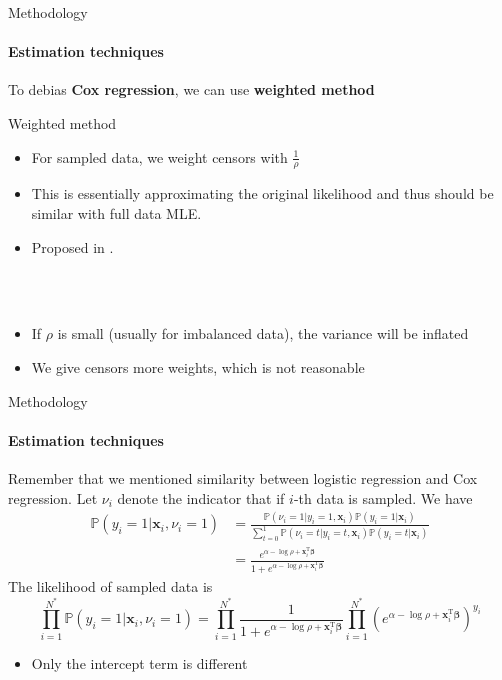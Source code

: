 \documentclass{beamer}
\newcommand{\red}{\color{red}}
\newcommand{\blue}{\color{blue}}
\newcommand{\bbeta}{\bm{\beta}}
\newcommand{\x}{\bm{x}}
\newcommand{\tp}{^{\mathrm{T}}}
\newcommand{\pr}{\mathbb{P}}
\begin{document}
\begin{frame}{Methodology}
    \framesubtitle{Estimation techniques}
    To debias {\blue\textbf{Cox regression}}, we can use {\red \textbf{weighted method}}
    \begin{block}{Weighted method}
        \begin{itemize}
            \item For sampled data, we weight censors with $\frac{1}{\rho}$
            \item This is essentially approximating the original likelihood and thus should be similar with full data MLE.
            \item Proposed in \cite{nir2023analyzing}.
        \end{itemize}
    \end{block}
    \hspace*{\fill}\\
    \hspace*{\fill}\\
    \begin{itemize}
        \item If $\rho$ is small (usually for imbalanced data), the variance will be inflated
        \item We give censors more weights, which is not reasonable
    \end{itemize}
    \end{frame}
\begin{frame}{Methodology}
    \framesubtitle{Estimation techniques}
    Remember that we mentioned similarity between logistic regression and Cox regression. Let $\nu_i$ denote the indicator that if $i$-th data is sampled. We have
    \begin{align*}
        \pr(y_i=1|\x_i,\nu_i=1)&=\frac{\pr(\nu_i=1|y_i=1,\x_i)\pr(y_i=1|\x_i)}{\sum_{t=0}^1\pr(\nu_i=t|y_i=t,\x_i)\pr(y_i=t|\x_i)}\\
        &=\frac{e^{\alpha-\log\rho+\x_i\tp\bbeta}}{1+e^{\alpha-\log\rho+\x_i\tp\bbeta}}
    \end{align*}
    The likelihood of sampled data is 
    \begin{equation*}
        \prod_{i=1}^{N^{*}}\pr(y_i=1|\x_i,\nu_i=1)=\prod_{i=1}^{N^{*}}\frac{1}{1+e^{\alpha-\log\rho+\x_i\tp\bbeta}}\prod_{i=1}^{N^{*}}\left(e^{\alpha-\log\rho+\x_i\tp\bbeta}\right)^{y_i}
    \end{equation*}
    \begin{itemize}
        \item Only the intercept term is different
    \end{itemize}
\end{frame}
\end{document}
